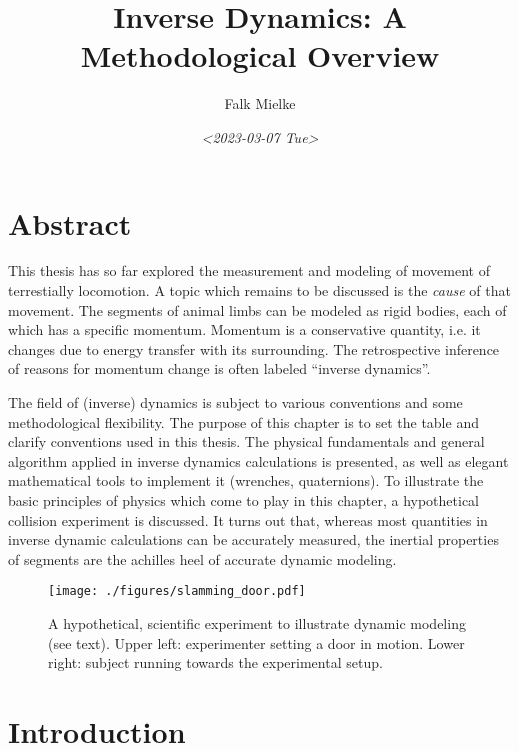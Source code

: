 \documentclass[10pt,a4paper]{article}
\author{Falk Mielke}
\date{\textit{<2023-03-07 Tue>}}
\title{Inverse Dynamics: A Methodological Overview}
\begin{document}
\maketitle
\tableofcontents

\clearpage


\section{Abstract}
\label{sec:org68ba509}
This thesis has so far explored the measurement and modeling of movement of terrestially locomotion.
A topic which remains to be discussed is the \emph{cause} of that movement.
The segments of animal limbs can be modeled as rigid bodies, each of which has a specific momentum.
Momentum is a conservative quantity, i.e. it changes due to energy transfer with its surrounding.
The retrospective inference of reasons for momentum change is often labeled ``inverse dynamics''.

The field of (inverse) dynamics is subject to various conventions and some methodological flexibility.
The purpose of this chapter is to set the table and clarify conventions used in this thesis.
The physical fundamentals and general algorithm applied in inverse dynamics calculations is presented, as well as elegant mathematical tools to implement it (wrenches, quaternions).
To illustrate the basic principles of physics which come to play in this chapter, a hypothetical collision experiment is discussed.
It turns out that, whereas most quantities in inverse dynamic calculations can be accurately measured, the inertial properties of segments are the achilles heel of accurate dynamic modeling.


\clearpage

\begin{figure}[htbp]
\centering
\texttt{[image: ./figures/slamming\_door.pdf]}
\caption{\label{fig:slamming}A hypothetical, scientific experiment to illustrate dynamic modeling (see text). Upper left: experimenter setting a door in motion. Lower right: subject running towards the experimental setup.}
\end{figure}


\section{Introduction}
\label{sec:orgb810841}
\end{document}
